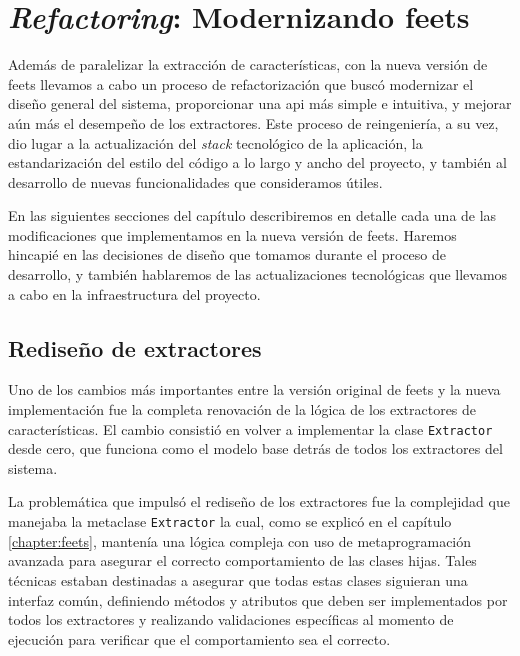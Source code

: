 \chapter[\emph{Refactoring}: Modernizando feets]{
    \emph{Refactoring}: Modernizando \acrshort{feets}
}
\label{chapter:refactoring}

Además de paralelizar la extracción de características, con la nueva versión de \gls{feets} llevamos a cabo un proceso de refactorización que buscó modernizar el diseño general del sistema, proporcionar una \gls{api} más simple e intuitiva, y mejorar aún más el desempeño de los extractores. Este proceso de reingeniería, a su vez, dio lugar a la actualización del \emph{stack} tecnológico de la aplicación, la estandarización del estilo del código a lo largo y ancho del proyecto, y también al desarrollo de nuevas funcionalidades que consideramos útiles.

En las siguientes secciones del capítulo describiremos en detalle cada una de las modificaciones que implementamos en la nueva versión de \gls{feets}. Haremos hincapié en las decisiones de diseño que tomamos durante el proceso de desarrollo, y también hablaremos de las actualizaciones tecnológicas que llevamos a cabo en la infraestructura del proyecto.  

\section{Rediseño de extractores}

Uno de los cambios más importantes entre la versión original de \gls{feets} y la nueva implementación fue la completa renovación de la lógica de los extractores de características. El cambio consistió en volver a implementar la clase \texttt{Extractor} desde cero, que funciona como el modelo base detrás de todos los extractores del sistema.

La problemática que impulsó el rediseño de los extractores fue la complejidad que manejaba la metaclase \texttt{Extractor} la cual, como se explicó en el capítulo \autoref{chapter:feets}, mantenía una lógica compleja con uso de metaprogramación avanzada para asegurar el correcto comportamiento de las clases hijas. Tales técnicas estaban destinadas a asegurar que todas estas clases siguieran una interfaz común, definiendo métodos y atributos que deben ser implementados por todos los extractores y realizando validaciones específicas al momento de ejecución para verificar que el comportamiento sea el correcto.

